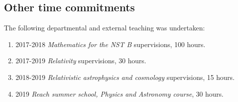 \documentclass[twoside]{report}
\begin{document}
\begin{multicols}{2}
\begin{appendices}
\section{Other time commitments}
The following departmental and external teaching was undertaken:
\begin{enumerate}
  \item 2017-2018 \textit{Mathematics for the NST B} supervisions, 100 hours.
  \item 2017-2019 \textit{Relativity} supervisions, 30 hours.
  \item 2018-2019 \textit{Relativistic astrophysics and cosmology} supervisions, 15 hours.
  \item 2019 \textit{Reach summer school, Physics and Astronomy course}, 30 hours.
\end{enumerate}
\end{appendices}
\end{multicols}
\hline
\begin{multicols}{2}
%


\end{multicols}
\end{document}
